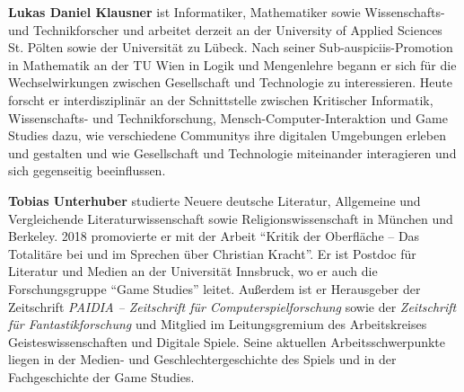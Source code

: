 \documentclass{scrartcl}
\begin{document}
\vspace{1em}
\noindent\textbf{\textsf{Lukas Daniel Klausner}} ist Informatiker, Mathematiker sowie Wissenschafts- und Technikforscher und arbeitet derzeit an der University of Applied Sciences St. Pölten sowie der Universität zu Lübeck.
Nach seiner Sub-auspiciis-Promotion in Mathematik an der TU Wien in Logik und Mengenlehre begann er sich für die Wechselwirkungen zwischen Gesellschaft und Technologie zu interessieren.
Heute forscht er interdisziplinär an der Schnittstelle zwischen Kritischer Informatik, Wissenschafts- und Technikforschung, Mensch-Computer-Interaktion und Game Studies dazu, wie verschiedene Communitys ihre digitalen Umgebungen erleben und gestalten und wie Gesellschaft und Technologie miteinander interagieren und sich gegenseitig beeinflussen.

\vspace{1em}
\noindent\textbf{\textsf{Tobias Unterhuber}} studierte Neuere deutsche Literatur, Allgemeine und Vergleichende Literaturwissenschaft sowie Religionswissenschaft in München und Berkeley.
2018 promovierte er mit der Arbeit \enquote{Kritik der Oberfläche -- Das Totalitäre bei und im Sprechen über Christian Kracht}.
Er ist Postdoc für Literatur und Medien an der Universität Innsbruck, wo er auch die Forschungsgruppe \enquote{Game Studies} leitet.
Außerdem ist er Herausgeber der Zeitschrift \textit{PAIDIA -- Zeitschrift für Computerspielforschung} sowie der \textit{Zeitschrift für Fantastikforschung} und Mitglied im Leitungsgremium des Arbeitskreises Geisteswissenschaften und Digitale Spiele.
Seine aktuellen Arbeitsschwerpunkte liegen in der Medien- und Geschlechtergeschichte des Spiels und in der Fachgeschichte der Game Studies.
\end{document}
